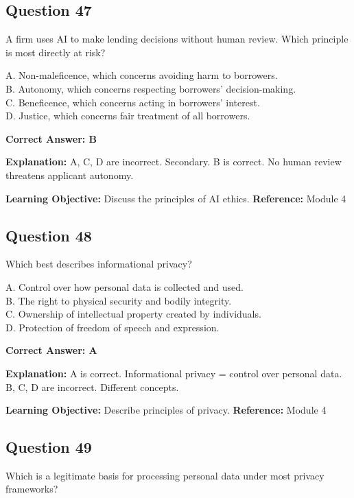 \documentclass[11pt]{article}
\begin{document}
	\subsection*{Question 47}
	A firm uses AI to make lending decisions without human review. Which
	principle is most directly at risk?
	
	A. Non-maleficence, which concerns avoiding harm to borrowers.\\
	B. Autonomy, which concerns respecting borrowers' decision-making.\\
	C. Beneficence, which concerns acting in borrowers' interest.\\
	D. Justice, which concerns fair treatment of all borrowers.
	
	\vspace{0.4em}
	\textbf{Correct Answer: B}
	
	\textbf{Explanation:}
	A, C, D are incorrect. Secondary.
	B is correct. No human review threatens applicant autonomy.
	
	\textbf{Learning Objective:} Discuss the principles of AI ethics.
	\textbf{Reference:} Module 4
	
	\subsection*{Question 48}
	Which best describes informational privacy?
	
	A. Control over how personal data is collected and used.\\
	B. The right to physical security and bodily integrity.\\
	C. Ownership of intellectual property created by individuals.\\
	D. Protection of freedom of speech and expression.
	
	\vspace{0.4em}
	\textbf{Correct Answer: A}
	
	\textbf{Explanation:}
	A is correct. Informational privacy = control over personal data.
	B, C, D are incorrect. Different concepts.
	
	\textbf{Learning Objective:} Describe principles of privacy.
	\textbf{Reference:} Module 4
	
	\subsection*{Question 49}
	Which is a legitimate basis for processing personal data under most
	privacy frameworks?
	
\end{document}
